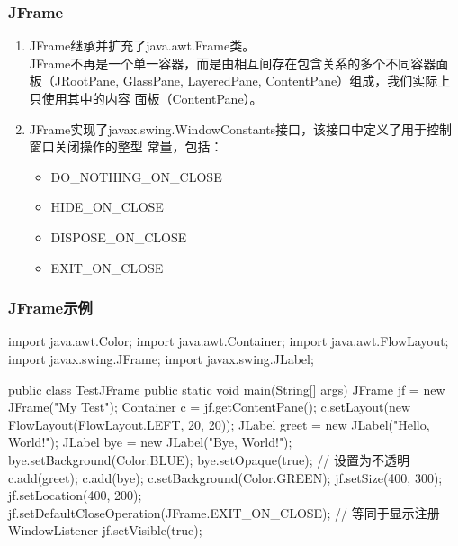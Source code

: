 \begin{frame}[fragile] %
  \frametitle{JFrame}
  \begin{enumerate}
  \item JFrame继承并扩充了java.awt.Frame类。\\
    {\kai JFrame不再是一个单一容器，而是由相互间存在包含关系的多个不同容器面
      板（JRootPane, GlassPane, LayeredPane, ContentPane）组成，我们实际上只使用其中的内容
      面板（ContentPane）。}
  \item JFrame实现了javax.swing.WindowConstants接口，该接口中定义了用于控制窗口关闭操作的整型
    常量，包括：
    \begin{itemize}\small
    \item DO\_NOTHING\_ON\_CLOSE
    \item HIDE\_ON\_CLOSE
    \item DISPOSE\_ON\_CLOSE
    \item EXIT\_ON\_CLOSE
    \end{itemize}
  \end{enumerate}
\end{frame}

\begin{frame}[fragile] %
  \frametitle{JFrame示例}
  \begin{javaCode}
    import java.awt.Color;
    import java.awt.Container;
    import java.awt.FlowLayout;
    import javax.swing.JFrame;
    import javax.swing.JLabel;

    public class TestJFrame {
      public static void main(String[] args){
        JFrame jf = new JFrame("My Test");
        Container c = jf.getContentPane(); 
        c.setLayout(new FlowLayout(FlowLayout.LEFT, 20, 20));
        JLabel greet = new JLabel("Hello, World!");
        JLabel bye = new JLabel("Bye, World!");
        bye.setBackground(Color.BLUE);
        bye.setOpaque(true); // 设置为不透明
        c.add(greet);
        c.add(bye);
        c.setBackground(Color.GREEN);
        jf.setSize(400, 300);
        jf.setLocation(400, 200);
        jf.setDefaultCloseOperation(JFrame.EXIT_ON_CLOSE); // 等同于显示注册 WindowListener
        jf.setVisible(true);
      }
    }
  \end{javaCode}
\end{frame}

